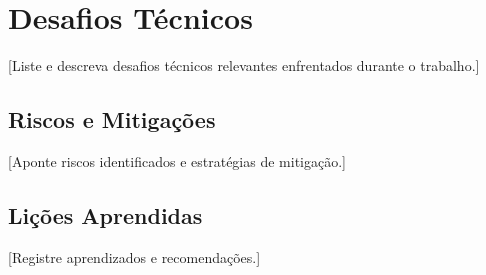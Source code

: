 \section{Desafios Técnicos}

[Liste e descreva desafios técnicos relevantes enfrentados durante o trabalho.]

\subsection{Riscos e Mitigações}
[Aponte riscos identificados e estratégias de mitigação.]

\subsection{Lições Aprendidas}
[Registre aprendizados e recomendações.]
